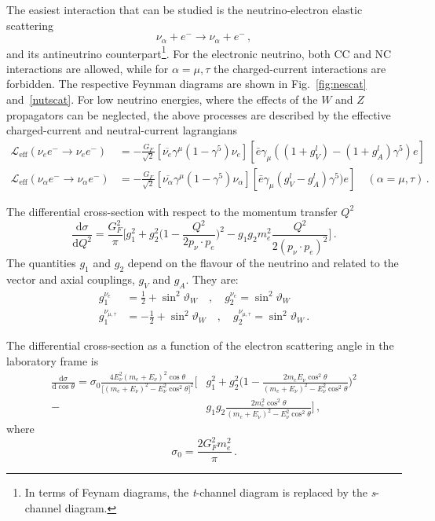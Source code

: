 The easiest interaction that can be studied is the neutrino-electron elastic scattering
\begin{equation}
	\nu_\alpha + e^- \rightarrow \nu_\alpha + e^-\,,
\end{equation}
and its antineutrino counterpart\footnote{In terms of Feynam diagrams, the \emph{t}-channel diagram is %
	replaced by the \emph{s}-channel diagram.}.
For the electronic neutrino, both CC and NC interactions are allowed, while for $\alpha = \mu, \tau$ the %
charged-current interactions are forbidden.
The respective Feynman diagrams are shown in Fig.~\ref{fig:nescat} and~\ref{nutscat}.
For low neutrino energies, where the effects of the $W$ and $Z$ propagators can be neglected, %
the above processes are described by the effective charged-current and neutral-current lagrangians
\begin{align}
	\mathcal{L}_\mathrm{eff}(\nu_e e^- \rightarrow \nu_e e^-) &= - \frac{G_F}{\sqrt{2}} %
	[\overline{\nu_e}\gamma^\mu(1-\gamma^5)\nu_e][\bar{e}\gamma_\mu((1+g_V^l)-(1+g_A^l)\gamma^5)e] \\
	\mathcal{L}_\mathrm{eff}(\nu_\alpha e^- \rightarrow \nu_\alpha e^-) &= - \frac{G_F}{\sqrt{2}} %
	[\overline{\nu_\alpha}\gamma^\mu(1-\gamma^5)\nu_\alpha][\bar{e}\gamma_\mu(g_V^l-g_A^l)\gamma^5)e] %
	\quad (\alpha = \mu,\tau)\,.
\end{align}

The differential cross-section with respect to the momentum transfer $Q^2$
\begin{equation}
	\frac{\mathrm{d}\sigma}{\mathrm{d}Q^2} = \frac{G_F^2}{\pi}\bigg[g_1^2 + g_2^2\bigg(1 - %
	\frac{Q^2}{2p_\nu \cdot p_e} \bigg)^2 - g_1 g_2 m_e^2 \frac{Q^2}{2 (p_\nu \cdot p_e)^2} \bigg]\,.
\end{equation}
The quantities $g_1$ and $g_2$ depend on the flavour of the neutrino and related to the vector and axial couplings, %
$g_V$ and $g_A$.
They are:
\begin{align}
	g_1^{\nu_e} &= \frac{1}{2} + \sin^2\vartheta_W \quad , \quad
	g_2^{\nu_e} = \sin^2\vartheta_W \\
	g_1^{\nu_{\mu,\tau}} &= -\frac{1}{2} + \sin^2\vartheta_W \quad , \quad
	g_2^{\nu_{\mu,\tau}} = \sin^2\vartheta_W\,.
\end{align}

The differential cross-section as a function of the electron scattering angle in the laboratory frame is
\begin{equation}
	\begin{split}
		\frac{\mathrm{d}\sigma}{\mathrm{d}\cos\theta} = \sigma_0 \frac{4 E_\nu^2 (m_e+E_\nu)^2 \cos \theta}%
		{\big[(m_e+E_\nu)^2-E_\nu^2 \cos^2 \theta \big]^2} \bigg[&g_1^2 + g_2^2\bigg(1 - %
		\frac{2 m_e E_\nu \cos^2 \theta}{(m_e+E_\nu)^2-E_\nu^2 \cos^2 \theta} \bigg)^2 \\
		- &g_1 g_2 \frac{2m_e^2 \cos^2 \theta}{(m_e+E_\nu)^2-E_\nu^2 \cos^2 \theta} \bigg]\,,
	\end{split}
\end{equation}
where 
\begin{equation}
	\sigma_0 = \frac{2 G_F^2 m_e^2}{\pi}\,.
\end{equation}

